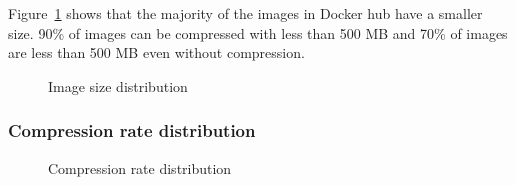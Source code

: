Figure~\ref{fig-image-size} shows that the majority of the images in Docker hub have a smaller size. 90\% of images can be compressed with less than 500 MB and 70\% of images are less than 500 MB even without compression. 

\begin{figure}[!t]
	\centering
	\caption{Image size distribution}
	\label{fig-image-size}
\end{figure}

\subsubsection{Compression rate distribution}

\begin{figure}[!t]
	\centering
	\caption{Compression rate distribution}
	\label{fig-image-compression-ratio}
\end{figure}

